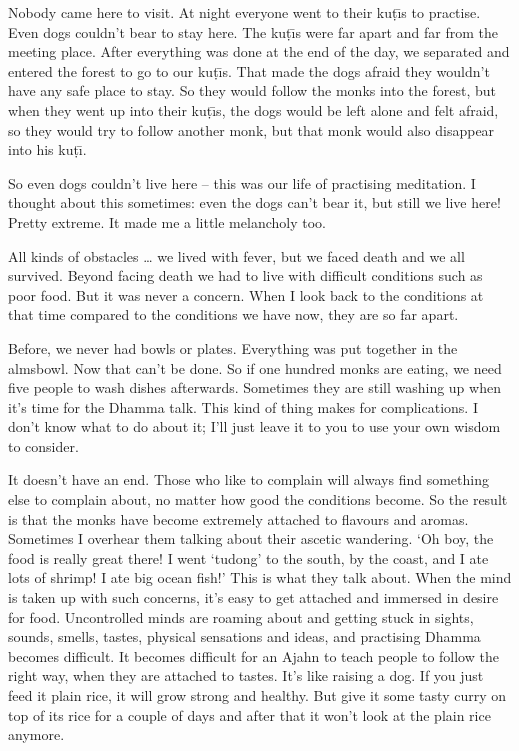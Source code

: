 Nobody came here to visit. At night everyone went to their ku\d{t}\={\i}s to practise. Even dogs couldn't bear to stay here. The ku\d{t}\={\i}s were far apart and far from the meeting place. After everything was done at the end of the day, we separated and entered the forest to go to our ku\d{t}\={\i}s. That made the dogs afraid they wouldn't have any safe place to stay. So they would follow the monks into the forest, but when they went up into their ku\d{t}\={\i}s, the dogs would be left alone and felt afraid, so they would try to follow another monk, but that monk would also disappear into his ku\d{t}\={\i}. 

So even dogs couldn't live here -- this was our life of practising meditation. I thought about this sometimes: even the dogs can't bear it, but still we live here! Pretty extreme. It made me a little melancholy too. 

All kinds of obstacles \ldots{} we lived with fever, but we faced death and we all survived. Beyond facing death we had to live with difficult conditions such as poor food. But it was never a concern. When I look back to the conditions at that time compared to the conditions we have now, they are so far apart. 

Before, we never had bowls or plates. Everything was put together in the almsbowl. Now that can't be done. So if one hundred monks are eating, we need five people to wash dishes afterwards. Sometimes they are still washing up when it's time for the Dhamma talk. This kind of thing makes for complications. I don't know what to do about it; I'll just leave it to you to use your own wisdom to consider. 

It doesn't have an end. Those who like to complain will always find something else to complain about, no matter how good the conditions become. So the result is that the monks have become extremely attached to flavours and aromas. Sometimes I overhear them talking about their ascetic wandering. `Oh boy, the food is really great there! I went `tudong' to the south, by the coast, and I ate lots of shrimp! I ate big ocean fish!' This is what they talk about. When the mind is taken up with such concerns, it's easy to get attached and immersed in desire for food. Uncontrolled minds are roaming about and getting stuck in sights, sounds, smells, tastes, physical sensations and ideas, and practising Dhamma becomes difficult. It becomes difficult for an Ajahn to teach people to follow the right way, when they are attached to tastes. It's like raising a dog. If you just feed it plain rice, it will grow strong and healthy. But give it some tasty curry on top of its rice for a couple of days and after that it won't look at the plain rice anymore. 

